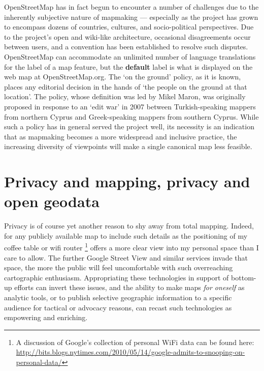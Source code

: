 \documentclass[11pt,oneside,notitlepage]{report}
\begin{document}
{{OpenStreetMap has in fact begun to encounter a number of challenges due to the inherently subjective nature of mapmaking --- especially as the project has grown to encompass dozens of countries, cultures, and socio-political perspectives. Due to the project's open and wiki-like architecture, occasional disagreements occur between users, and a convention has been established to resolve such disputes. OpenStreetMap can accommodate an unlimited number of language translations for the label of a map feature, but the \textbf{default} label is what is displayed on the web map at OpenStreetMap.org. The `on the ground' policy, as it is known, places any editorial decision in the hands of `the people on the ground at that location'. The policy, whose definition was led by Mikel Maron, was originally proposed in response to an `edit war' in 2007 between Turkish-speaking mappers from northern Cyprus and Greek-speaking mappers from southern Cyprus. \cite{osm2007disputes} While such a policy has in general served the project well, its necessity is an indication that as mapmaking becomes a more widespread and inclusive practice, the increasing diversity of viewpoints will make a single canonical map less feasible. 

\section{Privacy and mapping, privacy and open geodata}

Privacy is of course yet another reason to shy away from total mapping. Indeed, for any publicly available map to include such details as the positioning of my coffee table or wifi router \footnote{A discussion of Google's collection of personal WiFi data can be found here: \url{http://bits.blogs.nytimes.com/2010/05/14/google-admits-to-snooping-on-personal-data/}} offers a more clear view into my personal space than I care to allow. The further Google Street View and similar services invade that space, the more the public will feel uncomfortable with such overreaching cartographic enthusiasm. Appropriating these technologies in support of bottom-up efforts can invert these issues, and the ability to make maps \emph{for oneself} as analytic tools, or to publish selective geographic information to a specific audience for tactical or advocacy reasons, can recast such technologies as empowering and enriching.  

}}
\end{document}

